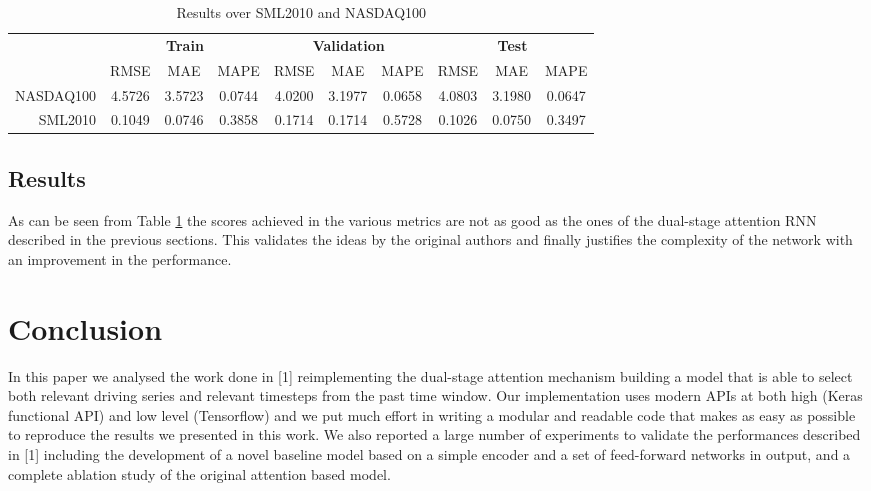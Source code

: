 \documentclass{article}
\begin{document}
\begin{center}
\begin{table}[h]
\begin{tabular}{r|c|c|c|c|c|c|c|c|c|}
\multicolumn{1}{r}{}
  & \multicolumn{3}{c}{\textbf{Train}}
  & \multicolumn{3}{c}{\textbf{Validation}}
  & \multicolumn{3}{c}{\textbf{Test}} \\
  \cline{2-10}
  & \multicolumn{1}{c}{RMSE}
  & \multicolumn{1}{c}{MAE}
  & \multicolumn{1}{c|}{MAPE}
  & \multicolumn{1}{c}{RMSE}
  & \multicolumn{1}{c}{MAE}
  & \multicolumn{1}{c|}{MAPE}
  & \multicolumn{1}{c}{RMSE}
  & \multicolumn{1}{c}{MAE}
  & \multicolumn{1}{c|}{MAPE}\\
\cline{2-10}
NASDAQ100 & 4.5726 & 3.5723 & 0.0744 & 4.0200 & 3.1977 & 0.0658 & 4.0803 &
3.1980 & 0.0647 \\
\cline{2-10}
SML2010 & 0.1049 & 0.0746 & 0.3858 & 0.1714 & 0.1714 & 0.5728 & 0.1026 & 0.0750
& 0.3497 \\
\cline{2-10}
\end{tabular}
\vspace{1em}
\caption{Results over SML2010 and NASDAQ100}
\label{results-encoder}
\end{table}
\end{center}


\subsection{Results}

As can be seen from Table \ref{results-encoder} the scores achieved in the various
metrics are not as good as the ones of the dual-stage attention RNN described
in the previous sections. This validates the ideas by the original authors and
finally justifies the complexity of the network with an improvement in the 
performance.



\section{Conclusion}

In this paper we analysed the work done in [1] reimplementing the dual-stage 
attention mechanism building a model that is able to select both relevant driving 
series and relevant timesteps from the past time window. Our implementation uses 
modern APIs at both high (Keras functional API) and low level (Tensorflow) and we 
put much effort in writing a modular and readable code that makes as easy as 
possible to reproduce the results we presented in this work. We also reported a 
large number of experiments to validate the performances described in [1] 
including the development of a novel baseline model based on a simple encoder and 
a set of feed-forward networks in output, and a complete ablation study of the 
original attention based model.
\end{document}
